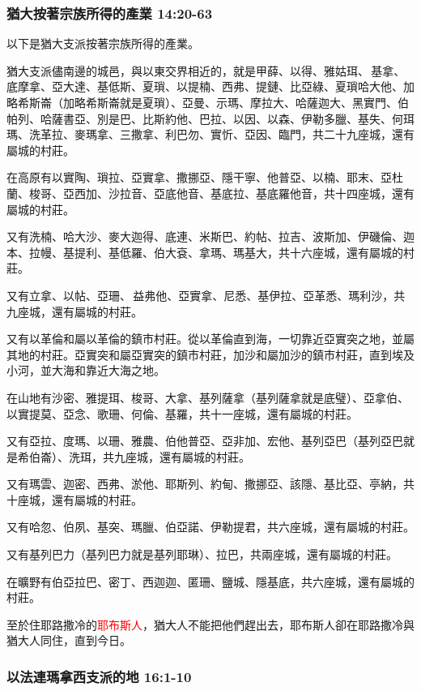 \subsubsection{猶大按著宗族所得的產業 14:20-63}
以下是猶大支派按著宗族所得的產業。

猶大支派儘南邊的城邑，與以東交界相近的，就是甲薛、以得、雅姑珥、 基拿、底摩拿、亞大達、基低斯、夏瑣、以提楠、西弗、提鏈、比亞綠、夏瑣哈大他、加略希斯崙（加略希斯崙就是夏瑣）、亞曼、示瑪、摩拉大、哈薩迦大、黑實門、伯帕列、哈薩書亞、別是巴、比斯約他、巴拉、以因、以森、伊勒多臘、基失、何珥瑪、洗革拉、麥瑪拿、三撒拿、利巴勿、實忻、亞因、臨門，共二十九座城，還有屬城的村莊。

在高原有以實陶、瑣拉、亞實拿、撒挪亞、隱干寧、他普亞、以楠、耶末、亞杜蘭、梭哥、亞西加、沙拉音、亞底他音、基底拉、基底羅他音，共十四座城，還有屬城的村莊。

又有洗楠、哈大沙、麥大迦得、底連、米斯巴、約帖、拉吉、波斯加、伊磯倫、迦本、拉幔、基提利、基低羅、伯大袞、拿瑪、瑪基大，共十六座城，還有屬城的村莊。

又有立拿、以帖、亞珊、 益弗他、亞實拿、尼悉、基伊拉、亞革悉、瑪利沙，共九座城，還有屬城的村莊。

又有以革倫和屬以革倫的鎮市村莊。從以革倫直到海，一切靠近亞實突之地，並屬其地的村莊。亞實突和屬亞實突的鎮市村莊，加沙和屬加沙的鎮市村莊，直到埃及小河，並大海和靠近大海之地。

在山地有沙密、雅提珥、梭哥、大拿、基列薩拿（基列薩拿就是底璧）、亞拿伯、以實提莫、亞念、歌珊、何倫、基羅，共十一座城，還有屬城的村莊。

又有亞拉、度瑪、以珊、雅農、伯他普亞、亞非加、宏他、基列亞巴（基列亞巴就是希伯崙）、洗珥，共九座城，還有屬城的村莊。

又有瑪雲、迦密、西弗、淤他、耶斯列、約甸、撒挪亞、該隱、基比亞、亭納，共十座城，還有屬城的村莊。

又有哈忽、伯夙、基突、瑪臘、伯亞諾、伊勒提君，共六座城，還有屬城的村莊。

又有基列巴力（基列巴力就是基列耶琳）、拉巴，共兩座城，還有屬城的村莊。

在曠野有伯亞拉巴、密丁、西迦迦、匿珊、鹽城、隱基底，共六座城，還有屬城的村莊。

至於住耶路撒冷的\textcolor{red}{耶布斯人}，猶大人不能把他們趕出去，耶布斯人卻在耶路撒冷與猶大人同住，直到今日。

\subsubsection{以法連瑪拿西支派的地 16:1-10}

